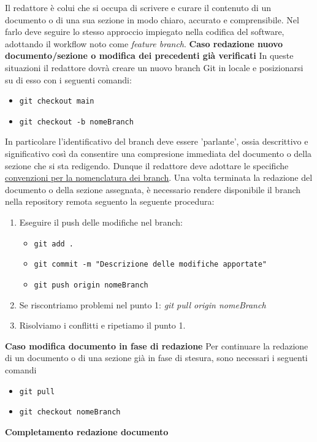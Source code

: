 Il redattore è colui che si occupa di scrivere e curare il contenuto di un documento o di una sua sezione in modo chiaro, accurato e comprensibile.
Nel farlo deve seguire lo stesso approccio impiegato nella codifica del software, adottando il
workflow noto come \textit{feature branch}.
\textbf{Caso redazione nuovo documento/sezione o modifica dei precedenti già verificati}
In queste situazioni il redattore dovrà creare un nuovo branch Git in locale e posizionarsi su di esso con i seguenti comandi:
\begin{itemize}
	\item \texttt{git checkout main}
	\item \texttt{git checkout -b nomeBranch}
\end{itemize}
In particolare l'identificativo del branch deve essere 'parlante', ossia descrittivo e significativo così da consentire una compresione immediata
del documento o della sezione che si sta redigendo. Dunque il redattore deve adottare le specifiche
\href{#convenzioni_nomenclatura}{\underline{convenzioni per la nomenclatura dei branch}}.
Una volta terminata la redazione del documento o della sezione assegnata, è necessario rendere disponibile il branch
nella repository remota seguento la seguente procedura:
\begin{enumerate}
	\item Eseguire il push delle modifiche nel branch:
	      \begin{itemize}
		      \item \texttt{git add .}
		      \item \texttt{git commit -m "Descrizione delle modifiche apportate"}
		      \item \texttt{git push origin nomeBranch}
	      \end{itemize}
	\item Se riscontriamo problemi nel punto 1:
	      \textit{git pull origin nomeBranch}
	\item Risolviamo i conflitti e ripetiamo il punto 1.
\end{enumerate}
\textbf{Caso modifica documento in fase di redazione}
Per continuare la redazione di un documento o di una sezione già in fase di stesura, sono necessari i seguenti comandi
\begin{itemize}
	\item \texttt{git pull}
	\item \texttt{git checkout nomeBranch}
\end{itemize}
\textbf{Completamento redazione documento}
